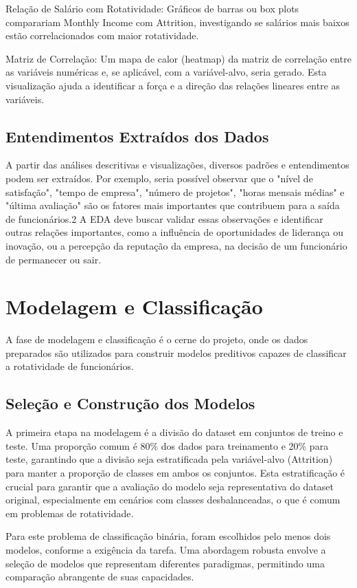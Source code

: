 \documentclass[sigconf]{acmart}
\begin{document}
Relação de Salário com Rotatividade: Gráficos de barras ou box plots comparariam Monthly Income com Attrition, investigando se salários mais baixos estão correlacionados com maior rotatividade.

Matriz de Correlação: Um mapa de calor (heatmap) da matriz de correlação entre as variáveis numéricas e, se aplicável, com a variável-alvo, seria gerado. Esta visualização ajuda a identificar a força e a direção das relações lineares entre as variáveis.

\subsection{Entendimentos Extraídos dos Dados}
A partir das análises descritivas e visualizações, diversos padrões e entendimentos podem ser extraídos. Por exemplo, seria possível observar que o "nível de satisfação", "tempo de empresa", "número de projetos", "horas mensais médias" e "última avaliação" são os fatores mais importantes que contribuem para a saída de funcionários.2 A EDA deve buscar validar essas observações e identificar outras relações importantes, como a influência de oportunidades de liderança ou inovação, ou a percepção da reputação da empresa, na decisão de um funcionário de permanecer ou sair.

\section{Modelagem e Classificação}
A fase de modelagem e classificação é o cerne do projeto, onde os dados preparados são utilizados para construir modelos preditivos capazes de classificar a rotatividade de funcionários.

\subsection{Seleção e Construção dos Modelos}
A primeira etapa na modelagem é a divisão do dataset em conjuntos de treino e teste. Uma proporção comum é 80\% dos dados para treinamento e 20\% para teste, garantindo que a divisão seja estratificada pela variável-alvo (Attrition) para manter a proporção de classes em ambos os conjuntos. Esta estratificação é crucial para garantir que a avaliação do modelo seja representativa do dataset original, especialmente em cenários com classes desbalanceadas, o que é comum em problemas de rotatividade.

Para este problema de classificação binária, foram escolhidos pelo menos dois modelos, conforme a exigência da tarefa. Uma abordagem robusta envolve a seleção de modelos que representam diferentes paradigmas, permitindo uma comparação abrangente de suas capacidades.
\end{document}

